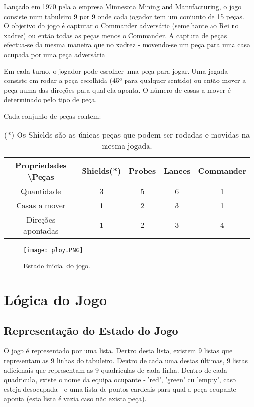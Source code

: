 \documentclass[a4paper]{article}
\begin{document}
Lançado em 1970 pela a empresa Minnesota Mining and Manufacturing, o jogo consiste num tabuleiro 9 por 9 onde cada jogador tem um conjunto de 15 peças.
O objetivo do jogo é capturar o Commander adversário (semelhante ao Rei no xadrez) ou então todas as peças menos o Commander. A captura de peças efectua-se da mesma maneira que no xadrez - movendo-se um peça para uma casa ocupada por uma peça adversária.

Em cada turno, o jogador pode escolher uma peça para jogar. Uma jogada consiste em rodar a peça escolhida (45º para qualquer sentido) ou então mover a peça numa das direções para qual ela aponta. O número de casas a mover é determinado pelo tipo de peça.

Cada conjunto de peças contem:

\begin{table}[ht]
\centering
\begin{tabular}[ht]{|c|c|c|c|c|}
  \hline
Propriedades \textbackslash \space Peças&Shields(*)&Probes&Lances&Commander\\
\hline
Quantidade&3&5&6&1\\
Casas a mover&1&2&3&1\\
Direções apontadas&1&2&3&4\\
\hline
\end{tabular}
\caption{(*) Os Shields são as únicas peças que podem ser rodadas e movidas na mesma jogada.}
\end{table}

\begin{figure}[ht]
\caption{Estado inicial do jogo.}
\centering
\texttt{[image: ploy.PNG]}
\end{figure}
\section{Lógica do Jogo}


\subsection{Representação do Estado do Jogo}
O jogo é representado por uma lista. Dentro desta lista, existem 9 listas que representam as 9 linhas do tabuleiro. Dentro de cada uma destas últimas, 9 listas adicionais que representam as 9 quadriculas de cada linha. Dentro de cada quadricula, existe o nome da equipa ocupante - 'red', 'green' ou 'empty', caso esteja desocupada - e uma lista de pontos cardeais para qual a peça ocupante aponta (esta lista é vazia caso não exista peça).
\end{document}
